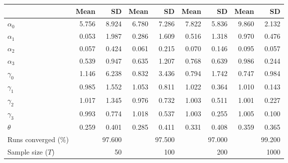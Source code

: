 
\begin{tabular}[t]{lrrrrrrrr}
\toprule
  & Mean & SD & Mean  & SD  & Mean   & SD   & Mean    & SD   \\
\midrule
$\alpha_{0}$ & 5.756 & 8.924 & 6.780 & 7.286 & 7.822 & 5.836 & 9.860 & 2.132\\
$\alpha_{1}$ & 0.053 & 1.987 & 0.286 & 1.609 & 0.516 & 1.318 & 0.970 & 0.476\\
$\alpha_{2}$ & 0.057 & 0.424 & 0.061 & 0.215 & 0.070 & 0.146 & 0.095 & 0.057\\
$\alpha_{3}$ & 0.539 & 0.947 & 0.635 & 1.207 & 0.768 & 0.639 & 0.986 & 0.244\\
$\gamma_{0}$ & 1.146 & 6.238 & 0.832 & 3.436 & 0.794 & 1.742 & 0.747 & 0.984\\
$\gamma_{1}$ & 0.985 & 1.552 & 1.053 & 0.811 & 1.022 & 0.364 & 1.010 & 0.143\\
$\gamma_{2}$ & 1.017 & 1.345 & 0.976 & 0.732 & 1.003 & 0.511 & 1.001 & 0.227\\
$\gamma_{3}$ & 0.993 & 0.774 & 1.018 & 0.537 & 1.003 & 0.255 & 1.005 & 0.100\\
$\theta$ & 0.259 & 0.401 & 0.285 & 0.411 & 0.331 & 0.408 & 0.359 & 0.365\\
Runs converged (\%) &  & 97.600 &  & 97.500 &  & 97.000 &  & 99.200\\
Sample size ($T$) &  & 50 &  & 100 &  & 200 &  & 1000\\
\bottomrule
\end{tabular}
